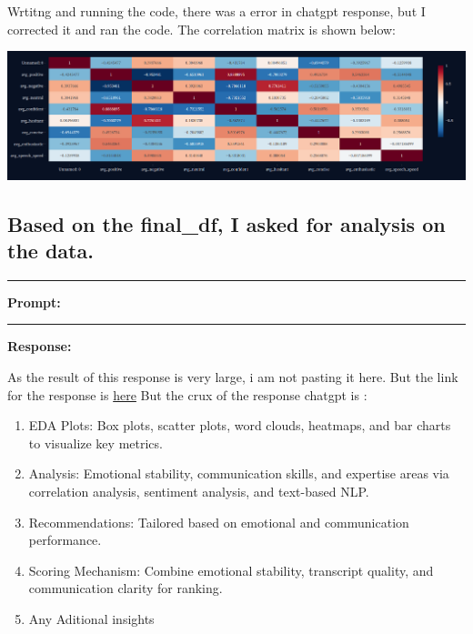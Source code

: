 \documentclass[11pt,a4paper]{article}
\begin{document}
\large{Wrtitng and running the code, there was a error in chatgpt response, but 
I corrected it and ran the code. The correlation matrix is shown below:}

\begin{center}
    \includegraphics[width=1\columnwidth]{images/corr.png}
\end{center}

\subsection{Based on the final\_df, I asked for analysis on the data.}
\begin{center}
    \color{red}\rule{1\linewidth}{1mm}
\end{center}
\textbf{Prompt:}
\begin{tcolorbox}
  
\end{tcolorbox}

\begin{center}
    \color{red}\rule{1\linewidth}{0.5mm}
\end{center}

\textbf{Response:}
\begin{tcolorbox}
   As the result of this response is very large, i am not pasting it here.
    But the link for the response is \href{https://chatgpt.com/share/66eac84c-2c84-800f-b800-e42a0607ce97}{here}
    But the crux of the response chatgpt is :
    \begin{enumerate}
        \item EDA Plots: Box plots, scatter plots, word clouds, heatmaps, and bar charts to visualize key metrics.
        \item Analysis: Emotional stability, communication skills, and expertise areas via correlation analysis, sentiment analysis, and text-based NLP.
        \item Recommendations: Tailored based on emotional and communication performance.
        \item Scoring Mechanism: Combine emotional stability, transcript quality, and communication clarity for ranking.
        \item Any Aditional insights
    \end{enumerate}
\end{tcolorbox}
\end{document}
